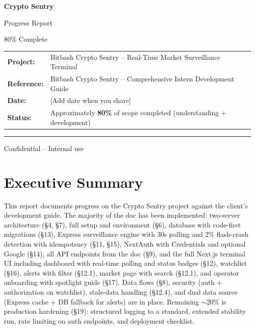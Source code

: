 \documentclass[11pt,a4paper]{report}
\begin{document}
\begin{titlepage}
  \centering
  \vspace*{1.5cm}
  {\Huge\bfseries Crypto Sentry\par}
  \vspace{0.8cm}
  {\LARGE Progress Report\par}
  \vspace{0.4cm}
  {\large 80\% Complete\par}
  \vspace{2cm}
  \begin{tabular}{ll}
    \textbf{Project:}    & Bitbash Crypto Sentry -- Real-Time Market Surveillance Terminal \\[0.4em]
    \textbf{Reference:}  & Bitbash Crypto Sentry -- Comprehensive Intern Development Guide  \\[0.4em]
    \textbf{Date:}       & [Add date when you share] \\[0.4em]
    \textbf{Status:}     & Approximately \textbf{80\%} of scope completed (understanding + development) \\
  \end{tabular}
  \vfill
  \rule{0.7\textwidth}{0.4pt}\par
  \vspace{0.3cm}
  \small Confidential -- Internal use
\end{titlepage}

\tableofcontents
\clearpage

\chapter{Executive Summary}

\begin{summarybox}
This report documents progress on the Crypto Sentry project against the client's development guide. The majority of the doc has been implemented: two-server architecture (\S4, \S7), full setup and environment (\S6), database with code-first migrations (\S13), Express surveillance engine with 30s polling and 2\% flash-crash detection with idempotency (\S11, \S15), NextAuth with Credentials and optional Google (\S14), all API endpoints from the doc (\S9), and the full Next.js terminal UI including dashboard with real-time polling and status badges (\S12), watchlist (\S16), alerts with filter (\S12.1), market page with search (\S12.1), and operator onboarding with spotlight guide (\S17). Data flows (\S8), security (auth + authorization on watchlist), stale-data handling (\S12.4), and dual data source (Express cache + DB fallback for alerts) are in place. Remaining $\sim$20\% is production hardening (\S19): structured logging to a standard, extended stability run, rate limiting on auth endpoints, and deployment checklist.
\end{summarybox}
\end{document}
